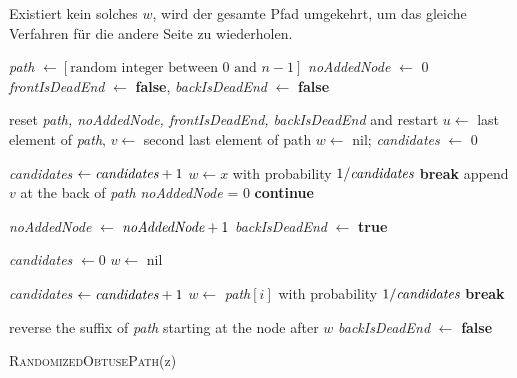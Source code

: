 \documentclass[a4paper, 10pt, ngerman]{article}
\begin{document}
Existiert kein solches $w$, wird der gesamte Pfad umgekehrt, um das gleiche Verfahren für die andere Seite zu wiederholen.

\begin{algorithm}
    \emph{path} $\gets [\text{random integer between 0 and $n - 1$}]$ \; 
    \emph{noAddedNode} $\gets$ 0 \;
    \emph{frontIsDeadEnd} $\gets$ \textbf{false}, \emph{backIsDeadEnd}  $\gets$ \textbf{false}\;

    {
        {
            reset \emph{path, noAddedNode, frontIsDeadEnd, backIsDeadEnd} and restart \;
        }
        $u \gets$ last element of \emph{path}, $v \gets$ second last element of path \;
        $w \gets$ nil; \;
        \emph{candidates} $\gets$ 0 \;

        {
            {
                \emph{candidates} $\gets \emph{candidates} + 1$ \;
                $w \gets x$ with probability $1 / \emph{candidates}$ \;
                {
                    \textbf{break} \;
                }
            }
        }
        {
            append $v$ at the back of \emph{path} \;
            \emph{noAddedNode} = 0 \;
            \textbf{continue} \;
        }

        \emph{noAddedNode} $\gets$ $\emph{noAddedNode} + 1$ \;
        \emph{backIsDeadEnd} $\gets$ \textbf{true} \;

        {
            \emph{candidates} $\gets 0$ \;
            $w \gets$ nil \;

            {
                {
                    \emph{candidates} $\gets \emph{candidates} + 1$ \;
                    $w \gets$ \emph{path}$[i]$ with probability $1 / \emph{candidates}$ \;
                    {
                        \textbf{break} \;
                    }
                }
            }

            {
                reverse the suffix of \emph{path} starting at the node after $w$ \;
                \emph{backIsDeadEnd} $\gets$ \textbf{false} \;
            } 
        } 

    }


    \caption{\textsc{RandomizedObtusePath}(z)}
\end{algorithm}
\end{document}
